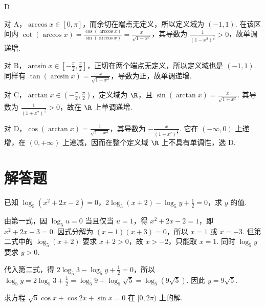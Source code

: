 \documentclass[UTF8,a4paper,oneside,11pt]{ctexbook}
\begin{document}
\begin{answer}
D
\end{answer}

\begin{solution}
对 A，\(\arccos x\in[0,\pi]\)，而余切在端点无定义，所以定义域为 \((-1,1)\). 在该区间内
\(\cot(\arccos x)=\frac{\cos(\arccos x)}{\sin(\arccos x)}=\frac{x}{\sqrt{1-x^2}}\)，其导数为 \(\frac1{(1-x^2)^{\frac{3}{2}}}>0\)，故单调递增.

对 B，\(\arcsin x\in[-\frac\pi2,\frac\pi2]\)，正切在两个端点无定义，所以定义域也是 \((-1,1)\). 同样有 \(\tan(\arcsin x)=\frac{x}{\sqrt{1-x^2}}\)，导数为正，故单调递增.

对 C，\(\arctan x\in(-\frac\pi2,\frac\pi2)\)，定义域为 \(\R\)，且
\(\sin(\arctan x)=\frac{x}{\sqrt{1+x^2}}\). 其导数为 \(\frac1{(1+x^2)^{\frac{3}{2}}}>0\)，故在 \(\R\) 上单调递增.

对 D，\(\cos(\arctan x)=\frac1{\sqrt{1+x^2}}\)，其导数为 \(-\frac{x}{(1+x^2)^{\frac{3}{2}}}\). 它在 \((-\infty,0)\) 上递增，在 \((0,+\infty)\) 上递减，因而在整个定义域 \(\R\) 上不具有单调性，选 D.
\end{solution}

\section{解答题}

\begin{problem}
已知 \(\log_5(x^2+2x-2)=0\)，\(2\log_5(x+2)-\log_5 y+\frac{1}{2}=0\)，求 \(y\) 的值.
\end{problem}

\begin{solution}
由第一式，因 \(\log_5 u=0\) 当且仅当 \(u=1\)，得
\(x^2+2x-2=1\)，即 \(x^2+2x-3=0\). 因式分解为 \((x-1)(x+3)=0\)，所以 \(x=1\) 或 \(x=-3\). 但第二式中的 \(\log_5(x+2)\) 要求 \(x+2>0\)，故 \(x>-2\)，只能取 \(x=1\). 同时 \(\log_5 y\) 要求 \(y>0\).

代入第二式，得 \(2\log_5 3-\log_5 y+\frac12=0\)，所以
\(\log_5 y=2\log_5 3+\frac12=\log_5 9+\log_5\sqrt5=\log_5\left(9\sqrt5\right)\). 因此 \(y=9\sqrt5\).
\end{solution}

\begin{problem}
求方程 \(\sqrt{5}\cos x+\cos 2x+\sin x=0\) 在 \([0,2\pi)\) 上的解.
\end{problem}
\end{document}
